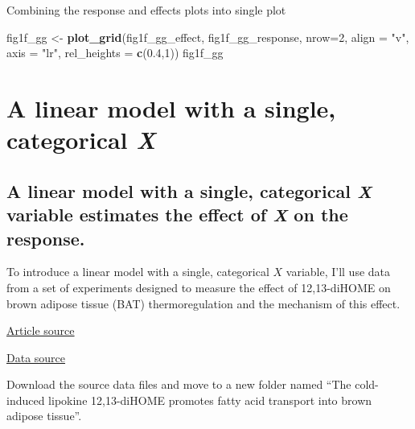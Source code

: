 \documentclass[]{book}
\newenvironment{Shaded}{\begin{snugshade}}{\end{snugshade}}
\newcommand{\DataTypeTok}[1]{\textcolor[rgb]{0.13,0.29,0.53}{#1}}
\newcommand{\DecValTok}[1]{\textcolor[rgb]{0.00,0.00,0.81}{#1}}
\newcommand{\FloatTok}[1]{\textcolor[rgb]{0.00,0.00,0.81}{#1}}
\newcommand{\KeywordTok}[1]{\textcolor[rgb]{0.13,0.29,0.53}{\textbf{#1}}}
\newcommand{\NormalTok}[1]{#1}
\newcommand{\StringTok}[1]{\textcolor[rgb]{0.31,0.60,0.02}{#1}}
\begin{document}
Combining the response and effects plots into single plot

\begin{Shaded}
\begin{Highlighting}[]
\NormalTok{fig1f_gg <-}\StringTok{ }\KeywordTok{plot_grid}\NormalTok{(fig1f_gg_effect,}
\NormalTok{                      fig1f_gg_response,}
                      \DataTypeTok{nrow=}\DecValTok{2}\NormalTok{,}
                      \DataTypeTok{align =} \StringTok{"v"}\NormalTok{,}
                      \DataTypeTok{axis =} \StringTok{"lr"}\NormalTok{,}
                      \DataTypeTok{rel_heights =} \KeywordTok{c}\NormalTok{(}\FloatTok{0.4}\NormalTok{,}\DecValTok{1}\NormalTok{))}
\NormalTok{fig1f_gg}
\end{Highlighting}
\end{Shaded}

\hypertarget{a-linear-model-with-a-single-categorical-x}{%
\chapter{\texorpdfstring{A linear model with a single, categorical \emph{X}}{A linear model with a single, categorical X}}\label{a-linear-model-with-a-single-categorical-x}}

\hypertarget{a-linear-model-with-a-single-categorical-x-variable-estimates-the-effect-of-x-on-the-response.}{%
\section{\texorpdfstring{A linear model with a single, categorical \emph{X} variable estimates the effect of \emph{X} on the response.}{A linear model with a single, categorical X variable estimates the effect of X on the response.}}\label{a-linear-model-with-a-single-categorical-x-variable-estimates-the-effect-of-x-on-the-response.}}

To introduce a linear model with a single, categorical \(X\) variable, I'll use data from a set of experiments designed to measure the effect of 12,13-diHOME on brown adipose tissue (BAT) thermoregulation and the mechanism of this effect.

\href{https://www.ncbi.nlm.nih.gov/pmc/articles/PMC5699924/pdf/nihms916046.pdf}{Article source}

\href{https://www.nature.com/articles/nm.4297\#Sec14}{Data source}

Download the source data files and move to a new folder named ``The cold-induced lipokine 12,13-diHOME promotes fatty acid transport into brown adipose tissue''.
\end{document}
